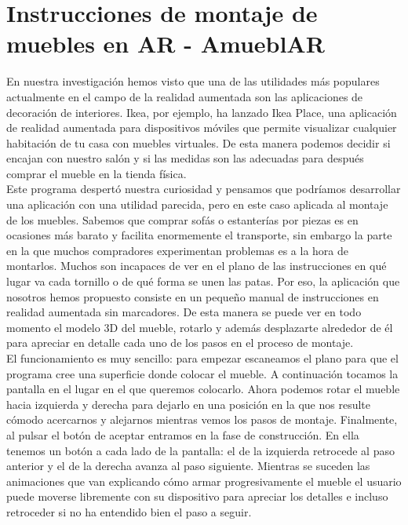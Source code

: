 \section{Instrucciones de montaje de muebles en AR - AmueblAR}

En nuestra investigación hemos visto que una de las utilidades más populares actualmente en el campo de la realidad aumentada son las aplicaciones de decoración de interiores. Ikea, por ejemplo, ha lanzado Ikea Place, una aplicación de realidad aumentada para dispositivos móviles que permite visualizar cualquier habitación de tu casa con muebles virtuales. De esta manera podemos decidir si encajan con nuestro salón y si las medidas son las adecuadas para después comprar el mueble en la tienda física.\\
Este programa despertó nuestra curiosidad y pensamos que podríamos desarrollar una aplicación con una utilidad parecida, pero en este caso aplicada al montaje de los muebles. Sabemos que comprar sofás o estanterías por piezas es en ocasiones más barato y facilita enormemente el transporte, sin embargo la parte en la que muchos compradores experimentan problemas es a la hora de montarlos. Muchos son incapaces de ver en el plano de las instrucciones en qué lugar va cada tornillo o de qué forma se unen las patas. Por eso, la aplicación que nosotros hemos propuesto consiste en un pequeño manual de instrucciones en realidad aumentada sin marcadores. De esta manera se puede ver en todo momento el modelo 3D del mueble, rotarlo y además desplazarte alrededor de él para apreciar en detalle cada uno de los pasos en el proceso de montaje.\\
El funcionamiento es muy sencillo: para empezar escaneamos el plano para que el programa cree una superficie donde colocar el mueble. A continuación tocamos la pantalla en el lugar en el que queremos colocarlo. Ahora podemos rotar el mueble hacia izquierda y derecha para dejarlo en una posición en la que nos resulte cómodo acercarnos y alejarnos mientras vemos los pasos de montaje. Finalmente, al pulsar el botón de aceptar entramos en la fase de construcción. En ella tenemos un botón a cada lado de la pantalla: el de la izquierda retrocede al paso anterior y el de la derecha avanza al paso siguiente. Mientras se suceden las animaciones que van explicando cómo armar progresivamente el mueble el usuario puede moverse libremente con su dispositivo para apreciar los detalles e incluso retroceder si no ha entendido bien el paso a seguir.\\
